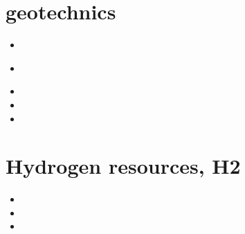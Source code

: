 \section{geotechnics}

\begin{small}
\begin{itemize}
\item[\nineteenninetynine] 
\item[\twothousandthree] 
 \\
\item[\twothousandfour] 
\item[\twothousandsix] 
\item[\twothousandfourteen] 
\end{itemize}
\end{small}







\section{Hydrogen resources, H2}

\begin{small}
\begin{itemize}
\item[2024]
\item[2025]
\item[2026]
\end{itemize}
\end{small}





